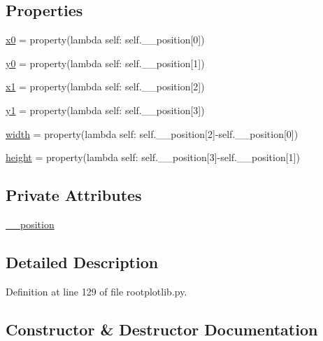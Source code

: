 \subsection*{Properties}
\begin{DoxyCompactItemize}
\item 
\hyperlink{classrootplotlib_1_1Legend_ac8334bbd6f73d5138565aa76e6bb1709}{x0} = property(lambda self\-: self.\-\_\-\-\_\-position\mbox{[}0\mbox{]})
\item 
\hyperlink{classrootplotlib_1_1Legend_a0028d0313be79ee86350021a3a7ba356}{y0} = property(lambda self\-: self.\-\_\-\-\_\-position\mbox{[}1\mbox{]})
\item 
\hyperlink{classrootplotlib_1_1Legend_a83d5ffe9d0ef8d0effd0c1555c64766c}{x1} = property(lambda self\-: self.\-\_\-\-\_\-position\mbox{[}2\mbox{]})
\item 
\hyperlink{classrootplotlib_1_1Legend_a126548e38889a0678e7848542dfff154}{y1} = property(lambda self\-: self.\-\_\-\-\_\-position\mbox{[}3\mbox{]})
\item 
\hyperlink{classrootplotlib_1_1Legend_a5b2f4e734af3ca094299e92506e899f4}{width} = property(lambda self\-: self.\-\_\-\-\_\-position\mbox{[}2\mbox{]}-\/self.\-\_\-\-\_\-position\mbox{[}0\mbox{]})
\item 
\hyperlink{classrootplotlib_1_1Legend_a36c5048e8fc02d72a80b3ea0207d2e2b}{height} = property(lambda self\-: self.\-\_\-\-\_\-position\mbox{[}3\mbox{]}-\/self.\-\_\-\-\_\-position\mbox{[}1\mbox{]})
\end{DoxyCompactItemize}
\subsection*{Private Attributes}
\begin{DoxyCompactItemize}
\item 
\hyperlink{classrootplotlib_1_1Legend_ae62ea052e5d3f8c5aac329d4cf02164a}{\-\_\-\-\_\-position}
\end{DoxyCompactItemize}


\subsection{Detailed Description}


Definition at line 129 of file rootplotlib.\-py.



\subsection{Constructor \& Destructor Documentation}
